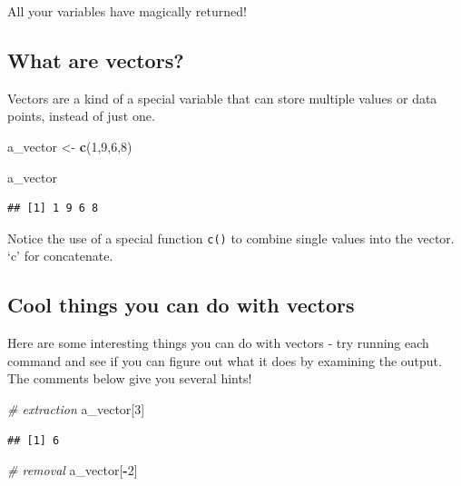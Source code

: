\documentclass[
]{book}
\newenvironment{Shaded}{\begin{snugshade}}{\end{snugshade}}
\newcommand{\CommentTok}[1]{\textcolor[rgb]{0.56,0.35,0.01}{\textit{#1}}}
\newcommand{\DecValTok}[1]{\textcolor[rgb]{0.00,0.00,0.81}{#1}}
\newcommand{\FunctionTok}[1]{\textcolor[rgb]{0.13,0.29,0.53}{\textbf{#1}}}
\newcommand{\NormalTok}[1]{#1}
\newcommand{\OtherTok}[1]{\textcolor[rgb]{0.56,0.35,0.01}{#1}}
\newcommand{\SpecialCharTok}[1]{\textcolor[rgb]{0.81,0.36,0.00}{\textbf{#1}}}
\begin{document}
All your variables have magically returned!

\subsection{What are vectors?}\label{what-are-vectors}

Vectors are a kind of a special variable that can store multiple values or data points, instead of just one.

\begin{Shaded}
\begin{Highlighting}[]
\NormalTok{a\_vector }\OtherTok{\textless{}{-}} \FunctionTok{c}\NormalTok{(}\DecValTok{1}\NormalTok{,}\DecValTok{9}\NormalTok{,}\DecValTok{6}\NormalTok{,}\DecValTok{8}\NormalTok{)}

\NormalTok{a\_vector}
\end{Highlighting}
\end{Shaded}

\begin{verbatim}
## [1] 1 9 6 8
\end{verbatim}

Notice the use of a special function \texttt{c()} to combine single values into the vector. `c' for concatenate.

\subsection{Cool things you can do with vectors}\label{cool-things-you-can-do-with-vectors}

Here are some interesting things you can do with vectors - try running each command and see if you can figure out what it does by examining the output. The comments below give you several hints!

\begin{Shaded}
\begin{Highlighting}[]
\CommentTok{\# extraction}
\NormalTok{a\_vector[}\DecValTok{3}\NormalTok{]}
\end{Highlighting}
\end{Shaded}

\begin{verbatim}
## [1] 6
\end{verbatim}

\begin{Shaded}
\begin{Highlighting}[]
\CommentTok{\# removal }
\NormalTok{a\_vector[}\SpecialCharTok{{-}}\DecValTok{2}\NormalTok{]}
\end{Highlighting}
\end{Shaded}
\end{document}
